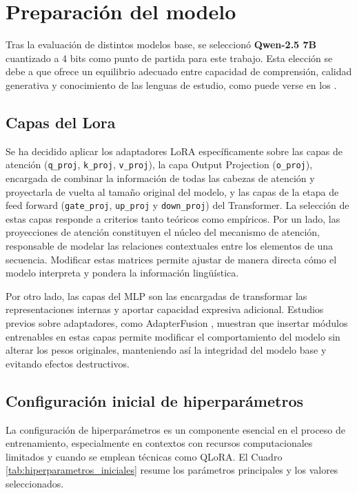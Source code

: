 \section{Preparación del modelo}

Tras la evaluación de distintos modelos base, se seleccionó \textbf{Qwen-2.5 7B} cuantizado a 4 bits como punto de partida para este trabajo. Esta elección se debe a que ofrece un equilibrio adecuado entre capacidad de comprensión, calidad generativa y conocimiento de las lenguas de estudio, como puede verse en los .

\subsection{Capas del Lora}

Se ha decidido aplicar los adaptadores LoRA  específicamente sobre las capas de atención (\texttt{q\_proj}, \texttt{k\_proj}, \texttt{v\_proj}), la capa Output Projection (\texttt{o\_proj}), encargada de combinar la información de todas las cabezas de atención y proyectarla de vuelta al tamaño original del modelo, y las capas de la etapa de feed forward (\texttt{gate\_proj}, \texttt{up\_proj} y  \texttt{down\_proj}) del Transformer.
La selección de estas capas responde a criterios tanto teóricos como empíricos. Por un lado, las proyecciones de atención constituyen el núcleo del mecanismo de atención, responsable de modelar las relaciones contextuales entre los elementos de una secuencia. Modificar estas matrices permite ajustar de manera directa cómo el modelo interpreta y pondera la información lingüística.

Por otro lado, las capas del MLP son las encargadas de transformar las representaciones internas y aportar capacidad expresiva adicional. Estudios previos sobre adaptadores, como AdapterFusion \cite{pfeiffer2021adapterfusionnondestructivetaskcomposition}, muestran que insertar módulos entrenables en estas capas permite modificar el comportamiento del modelo sin alterar los pesos originales, manteniendo así la integridad del modelo base y evitando efectos destructivos.

\subsection{Configuración inicial de hiperparámetros}

La configuración de hiperparámetros es un componente esencial en el proceso de entrenamiento, especialmente en contextos con recursos computacionales limitados y cuando se emplean técnicas como QLoRA. El Cuadro \ref{tab:hiperparametros_iniciales} resume los parámetros principales y los valores seleccionados.

